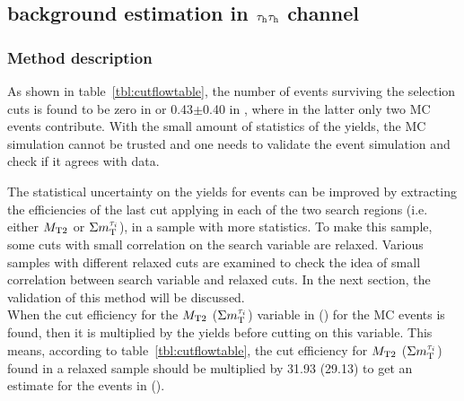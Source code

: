 \subsection{\texorpdfstring{\wjets background estimation in $\tau_{\rm h}\tau_{\rm h}$ channel}{Wjets background estimation in tau-tau channel}}
\label{sect:bkgW}
\subsubsection{Method description}
As shown in table~\ref{tbl:cutflowtable}, the number of \wjets events surviving 
the selection cuts is found to be zero in \binone or 0.43$\pm$0.40 
in \bintwo, where in the latter only two MC events contribute. With the small amount of statistics of the \wjets yields, the \wjets MC simulation cannot be trusted and one needs to validate the \wjets event simulation and check if it agrees with data.

 The statistical uncertainty on the yields for \wjets events can be improved by extracting 
the efficiencies of the last cut applying in each of the two search regions (i.e. either ${M_{\rm T2}}$ or $\Sigma m_{\rm T}^{\tau_i}$), in a sample with more statistics. To make this sample, some cuts with small correlation on the search variable are 
relaxed. Various samples with different relaxed cuts are examined to check the idea of small correlation 
between search variable and relaxed cuts. In the next section, the validation of this method will be discussed.\\
When the cut efficiency for the ${M_{\rm T2}}$ ($\Sigma m_{\rm T}^{\tau_i}$) variable in \binone (\bintwo) for the \wjets MC events is found, then it is multiplied by the \wjets 
yields before cutting on this variable. This means, according to table~\ref{tbl:cutflowtable}, the cut efficiency for 
${M_{\rm T2}}$ ($\Sigma m_{\rm T}^{\tau_i}$) found in a relaxed sample should be multiplied by 31.93 (29.13) to get an 
estimate for the \wjets events in  \binone (\bintwo).\\

